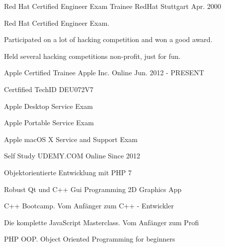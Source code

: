 

\begin{cventries}

  \cventry
    {Red Hat Certified Engineer Exam Trainee} %
    {RedHat} %
    {Stuttgart} %
    {Apr. 2000} %
    {
      \begin{cvitems} %
        \item {Red Hat Certified Engineer Exam.}
        \item {Participated on a lot of hacking competition and won a good award.}
        \item {Held several hacking competitions non-profit, just for fun.}
      \end{cvitems}
    }

  \cventry
    {Apple Certified Trainee} %
    {Apple Inc.} %
    {Online} %
    {Jun. 2012 - PRESENT} %
    {
      \begin{cvitems} %
        \item {Certfified TechID DEU072V7}
		\item {Apple Desktop Service Exam}
        \item {Apple Portable Service Exam}
		\item {Apple macOS X Service and Support Exam}
      \end{cvitems}
    }

  \cventry
    {Self Study} %
    {UDEMY.COM} %
    {Online} %
    {Since 2012} %
    {
      \begin{cvitems} %
		\item {Objektorientierte Entwicklung mit PHP 7}
		\item {Robust Qt und C++ Gui Programming 2D Graphics App}
		\item {C++ Bootcamp. Vom Anfänger zum C++ - Entwickler}
		\item {Die komplette JavaScript Masterclass. Vom Anfänger zum Profi}
		\item {PHP OOP. Object Oriented Programming for beginners}
      \end{cvitems}
    }


\end{cventries}
